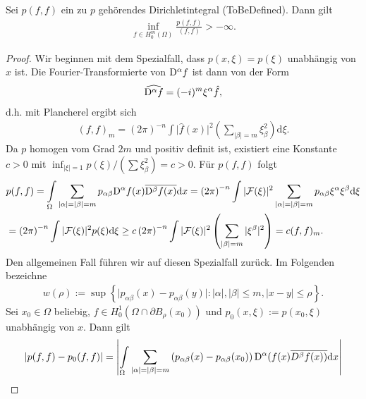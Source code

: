 \begin{thm}
Sei $p(f,f)$ ein zu $p$ gehörendes Dirichletintegral (ToBeDefined). Dann gilt 
\begin{align}
	\inf\limits_{f \in H_0^m(\Omega)} \frac{p(f,f)}{(f,f)} > -\infty.
\end{align}
\end{thm}
\begin{proof}
	Wir beginnen mit dem Spezialfall, dass $p(x,\xi) = p(\xi)$ unabhängig von $x$ ist. Die Fourier-Transformierte von $\mathrm D^\alpha f$ ist dann von der Form
	\begin{align}
		\widehat{\mathrm D^\alpha f} = (-i)^m\xi^\alpha \hat{f}, 
	\end{align}
	d.h. mit Plancherel ergibt sich
	\begin{align}
		(f,f)_m = (2\pi)^{-n}\int \vert\hat{f}(x)\vert^2 \left(\sum\limits_{\vert \beta \vert = m} \xi_\beta^2\right)\mathrm{d}\xi.
	\end{align}
	Da $p$ homogen vom Grad $2m$ und positiv definit ist, existiert eine Konstante $c>0$ mit $\inf_{\vert \xi \vert =1} p(\xi)/(\sum  \xi_\beta^2) = c >0$. Für $p(f,f)$ folgt
	\begin{align}
		\begin{split}&p(f,f) = \int\limits_\Omega \sum\limits_{\vert\alpha\vert = \vert \beta\vert =m}p_{\alpha\beta}\mathrm D^\alpha f(x)\overline{\mathrm D^\beta f(x)}\mathrm{d}x =\left(2\pi\right)^{-n}\int\vert \mathcal{F}(\xi)\vert^2\sum\limits_{\vert\alpha\vert =\vert\beta\vert = m}p_{\alpha\beta}\xi^{\alpha}\xi^\beta\mathrm{d}\xi\\
& = \left(2\pi\right)^{-n} \int \vert \mathcal{F}(\xi)\vert^2 p(\xi)\mathrm{d}\xi \ge c \left(2\pi\right)^{-n}\int\vert\mathcal{F}(\xi)\vert^2  \left(\sum\limits_{\vert \beta\vert=m} \vert\xi^\beta\vert^2\right)		= c (f,f)_m.
\end{split}
\end{align}	
Den allgemeinen Fall führen wir auf diesen Spezialfall zurück. Im Folgenden bezeichne
\begin{align}
	w(\rho):= \sup\left\{\vert p_{\alpha\beta}(x)-p_{\alpha\beta}(y)\vert : \vert\alpha\vert, \vert\beta\vert \le m, \vert x-y\vert \le \rho\right\}.
\end{align} 
Sei $x_0\in \Omega$ beliebig, $f\in H_0^1\left(\Omega\cap \partial B_\rho(x_0)\right)$ und $p_0(x, \xi):=p(x_0,\xi)$ unabhängig von $x$. Dann gilt
\begin{align}
\begin{split}
	&\vert p(f,f)-p_0(f,f)\vert=\left\vert \int\limits_\Omega\sum\limits_{\vert\alpha\vert=\vert\beta\vert =m} \left(p_{\alpha\beta}(x)-p_{\alpha\beta}(x_0)\right){\D^\alpha(f(x)}\overline{D^\beta f(x))}\mathrm{d}x\right\vert\\

\end{split}
\end{align}
\end{proof}
